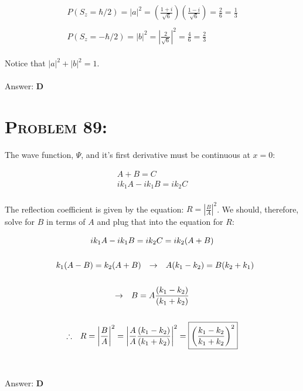 \documentclass{article}
\begin{document}
\begin{gather}
P(S_{z} = \hbar / 2) = |a|^{2} = \left(  \frac{1+ i}{\sqrt{6}}  \right) \left(  \frac{1- i}{\sqrt{6}}  \right) = \frac{2}{6} = \frac{1}{3}\nonumber\\
\nonumber\\
P(S_{z} = - \hbar / 2) = |b|^2 = \left|  \frac{2}{\sqrt{6}} \right|^{2}= \frac{4}{6} = \boxed{\frac{2}{3}}\nonumber
\end{gather}
\\
Notice that $|a|^{2} + |b|^{2} = 1$.
\\\\
Answer: \textbf{\textcolor{ProcessBlue}D}\\


\section{\textsc{Problem 89:}} The wave function, $\Psi$, and it's first derivative must be continuous at $x = 0$:

\begin{gather}
A + B = C\\
ik_{1}A - ik_{1}B = ik_{2}C
\end{gather}
\\
The reflection coefficient is given by the equation: $R = \left|   \frac{B}{A}   \right|^{2}$. We should, therefore, solve for $B$ in terms of $A$ and plug that into the equation for $R$:

\begin{gather}
ik_{1}A - ik_{1}B = ik_{2}C = ik_{2}(A + B)\nonumber\\
\nonumber\\
\hspace{.1in} k_{1} (A - B) = k_{2} (A + B) \hspace{.1in} \rightarrow \hspace{.1in} A (k_{1} -  k_{2}) = B (k_{2} + k_{1})\nonumber\\
\nonumber\\
\rightarrow  \hspace{.1in}  B = A \frac{(k_{1} -  k_{2})}{(k_{1} +  k_{2})}\nonumber\\
\nonumber\\
\therefore \hspace{.1in} R = \left|   \frac{B}{A}   \right|^{2} = \left|   \frac{A}{A}\frac{(k_{1} -  k_{2})}{(k_{1} +  k_{2})}   \right|^{2} = \boxed{\left(   \frac{k_{1} -  k_{2}}{k_{1} +  k_{2}}   \right)^{2}}\nonumber
\end{gather}
\\\\
Answer: \textbf{\textcolor{ProcessBlue}D}\\
\end{document}
